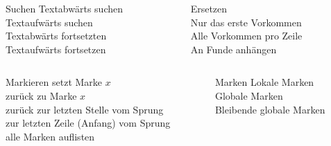 \documentclass[aspectratio=43]{beamer}
\begin{document}
\begin{frame} 
\begin{columns}
        \begin{column}{0.32\textwidth}
          \begin{exampleblock}{Suchen} 
            \textcolor{gray}{\taste{:}}\taste{/}  Textabwärts suchen\\
            \textcolor{gray}{\taste{:}}  Textaufwärts suchen\\
             Textabwärts fortsetzten\\
             Textaufwärts fortsetzen
          \end{exampleblock}
        \end{column}
        \begin{column}{0.75\textwidth} 
          \begin{exampleblock}{Ersetzen} 
            \\
             Nur das erste Vorkommen\\
             Alle Vorkommen pro Zeile\\
             An Funde anhängen
          \end{exampleblock}
        \end{column} 
\end{columns}
\begin{columns}
        \begin{column}{0.7\textwidth}
        \begin{exampleblock}{Markieren} 
         setzt Marke $x$\\
          zurück zu Marke $x$\\
         zurück zur letzten Stelle vom Sprung\\
         zur letzten Zeile (Anfang) vom Sprung\\
        \taste{:} alle Marken auflisten
        \end{exampleblock}
        \end{column} 
        \begin{column}{0.3\textwidth} 
        \begin{exampleblock}{Marken} 
         Lokale Marken\\
         Globale Marken\\
         Bleibende globale Marken\\
        \end{exampleblock}              
        \end{column} 
\end{columns}
\end{frame}
\end{document}
